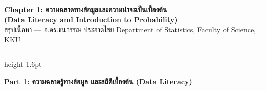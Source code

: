 \documentclass[9pt]{extarticle}
\begin{document}
\begin{center}
{\Large\bfseries\color{navy} Chapter 1: ความฉลาดทางข้อมูลและความน่าจะเป็นเบื้องต้น}\\[1pt]
{\normalsize\bfseries\color{gold!70!black} (Data Literacy and Introduction to Probability)}\\[2pt]
{\small สรุปเนื้อหา — อ.ดร.ธนวรรณ ประฮาดไชย \quad Department of Statistics, Faculty of Science, KKU}
\end{center}
\vspace{2pt}
{\color{gold}\hrule height 1.6pt}
\vspace{3pt}
\begin{center}
{\bfseries\color{navy} Part 1: ความฉลาดรู้ทางข้อมูล และสถิติเบื้องต้น (Data Literacy)}
\end{center}
\vspace{2pt}
\end{document}
